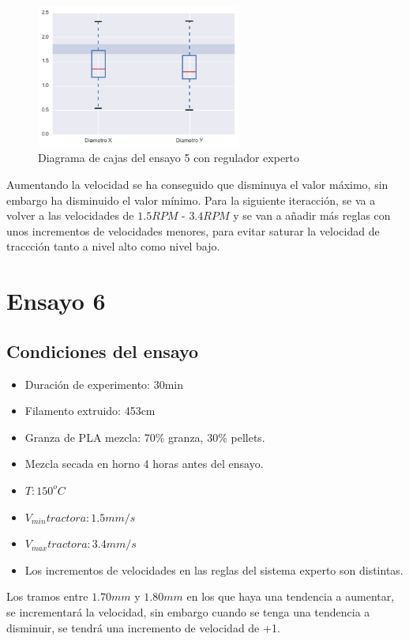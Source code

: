 \begin{figure}[H]
    \centering
    \includegraphics[width=0.6\textwidth]{images/producciones/13082015/output_10_e2.png}
    \caption{Diagrama de cajas del ensayo 5 con regulador experto}
    \label{fig:reg_cajas5}
\end{figure}

Aumentando la velocidad se ha conseguido que disminuya el valor máximo, sin embargo ha disminuido el valor mínimo. Para la siguiente iteracción, se va a volver a las velocidades de $1.5RPM$ - $3.4RPM$ y se van a añadir más reglas con unos incrementos de velocidades menores, para evitar saturar la velocidad de traccción tanto a nivel alto como nivel bajo.

\section{Ensayo 6}
\subsection{Condiciones del ensayo}


\begin{itemize}
	\item{Duración de experimento: 30min}
	\item{Filamento extruido: 453cm}
	\item{Granza de PLA mezcla: 70\% granza, 30\% pellets.}
	\item{Mezcla secada en horno 4 horas antes del ensayo.}
	\item{$T: 150^oC$}
	\item{$V_{min} tractora: 1.5 mm/s$}
	\item{$V_{max} tractora: 3.4 mm/s$}
	\item{Los incrementos de velocidades en las reglas del sistema experto son distintas.}
\end{itemize}

 Los tramos entre $1.70 mm$ y $1.80mm$ en los que haya una tendencia a aumentar, se incrementará la velocidad, sin embargo cuando se tenga una tendencia a disminuir, se tendrá una incremento de velocidad de +1.\\
